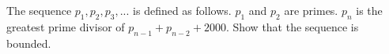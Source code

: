 The sequence $p_1, p_2, p_3, ...$ is defined as follows. $p_1$ and $p_2$ are primes. $p_n$ is the greatest prime divisor of $p_{n-1} + p_{n-2} + 2000$. Show that the sequence is bounded.